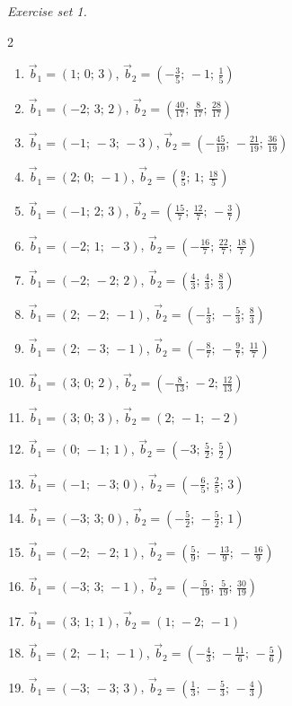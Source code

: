 \par\noindent\emph{Exercise set 1.}\nopagebreak
\begin{multicols}{2}\raggedright
\begin{enumerate}[label=\arabic*., leftmargin=*, itemsep=1pt]
\item $\vec b_1=(1;\,0;\,3)$, $\vec b_2=(-\frac{3}{5};\,-1;\,\frac{1}{5})$
\item $\vec b_1=(-2;\,3;\,2)$, $\vec b_2=(\frac{40}{17};\,\frac{8}{17};\,\frac{28}{17})$
\item $\vec b_1=(-1;\,-3;\,-3)$, $\vec b_2=(-\frac{45}{19};\,-\frac{21}{19};\,\frac{36}{19})$
\item $\vec b_1=(2;\,0;\,-1)$, $\vec b_2=(\frac{9}{5};\,1;\,\frac{18}{5})$
\item $\vec b_1=(-1;\,2;\,3)$, $\vec b_2=(\frac{15}{7};\,\frac{12}{7};\,-\frac{3}{7})$
\item $\vec b_1=(-2;\,1;\,-3)$, $\vec b_2=(-\frac{16}{7};\,\frac{22}{7};\,\frac{18}{7})$
\item $\vec b_1=(-2;\,-2;\,2)$, $\vec b_2=(\frac{4}{3};\,\frac{4}{3};\,\frac{8}{3})$
\item $\vec b_1=(2;\,-2;\,-1)$, $\vec b_2=(-\frac{1}{3};\,-\frac{5}{3};\,\frac{8}{3})$
\item $\vec b_1=(2;\,-3;\,-1)$, $\vec b_2=(-\frac{8}{7};\,-\frac{9}{7};\,\frac{11}{7})$
\item $\vec b_1=(3;\,0;\,2)$, $\vec b_2=(-\frac{8}{13};\,-2;\,\frac{12}{13})$
\item $\vec b_1=(3;\,0;\,3)$, $\vec b_2=(2;\,-1;\,-2)$
\item $\vec b_1=(0;\,-1;\,1)$, $\vec b_2=(-3;\,\frac{5}{2};\,\frac{5}{2})$
\item $\vec b_1=(-1;\,-3;\,0)$, $\vec b_2=(-\frac{6}{5};\,\frac{2}{5};\,3)$
\item $\vec b_1=(-3;\,3;\,0)$, $\vec b_2=(-\frac{5}{2};\,-\frac{5}{2};\,1)$
\item $\vec b_1=(-2;\,-2;\,1)$, $\vec b_2=(\frac{5}{9};\,-\frac{13}{9};\,-\frac{16}{9})$
\item $\vec b_1=(-3;\,3;\,-1)$, $\vec b_2=(-\frac{5}{19};\,\frac{5}{19};\,\frac{30}{19})$
\item $\vec b_1=(3;\,1;\,1)$, $\vec b_2=(1;\,-2;\,-1)$
\item $\vec b_1=(2;\,-1;\,-1)$, $\vec b_2=(-\frac{4}{3};\,-\frac{11}{6};\,-\frac{5}{6})$
\item $\vec b_1=(-3;\,-3;\,3)$, $\vec b_2=(\frac{1}{3};\,-\frac{5}{3};\,-\frac{4}{3})$

\end{enumerate}
\end{multicols}
